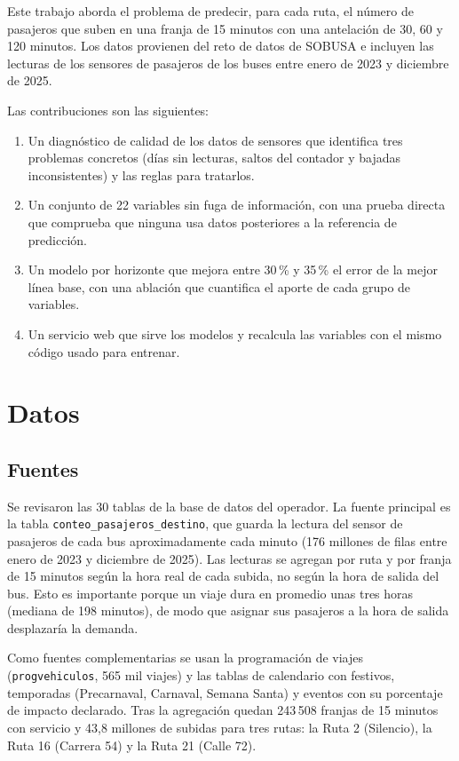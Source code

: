 \documentclass[11pt,a4paper]{article}
\begin{document}
Este trabajo aborda el problema de predecir, para cada ruta, el número de pasajeros que suben en una franja de 15 minutos con una antelación de 30, 60 y 120 minutos. Los datos provienen del reto de datos de SOBUSA e incluyen las lecturas de los sensores de pasajeros de los buses entre enero de 2023 y diciembre de 2025.

Las contribuciones son las siguientes:
\begin{enumerate}
  \item Un diagnóstico de calidad de los datos de sensores que identifica tres problemas concretos (días sin lecturas, saltos del contador y bajadas inconsistentes) y las reglas para tratarlos.
  \item Un conjunto de 22 variables sin fuga de información, con una prueba directa que comprueba que ninguna usa datos posteriores a la referencia de predicción.
  \item Un modelo por horizonte que mejora entre 30\,\% y 35\,\% el error de la mejor línea base, con una ablación que cuantifica el aporte de cada grupo de variables.
  \item Un servicio web que sirve los modelos y recalcula las variables con el mismo código usado para entrenar.
\end{enumerate}

\section{Datos}

\subsection{Fuentes}

Se revisaron las 30 tablas de la base de datos del operador. La fuente principal es la tabla \texttt{conteo\_pasajeros\_destino}, que guarda la lectura del sensor de pasajeros de cada bus aproximadamente cada minuto (176 millones de filas entre enero de 2023 y diciembre de 2025). Las lecturas se agregan por ruta y por franja de 15 minutos según la hora real de cada subida, no según la hora de salida del bus. Esto es importante porque un viaje dura en promedio unas tres horas (mediana de 198 minutos), de modo que asignar sus pasajeros a la hora de salida desplazaría la demanda.

Como fuentes complementarias se usan la programación de viajes (\texttt{progvehiculos}, 565 mil viajes) y las tablas de calendario con festivos, temporadas (Precarnaval, Carnaval, Semana Santa) y eventos con su porcentaje de impacto declarado. Tras la agregación quedan 243\,508 franjas de 15 minutos con servicio y 43,8 millones de subidas para tres rutas: la Ruta 2 (Silencio), la Ruta 16 (Carrera 54) y la Ruta 21 (Calle 72).
\end{document}
